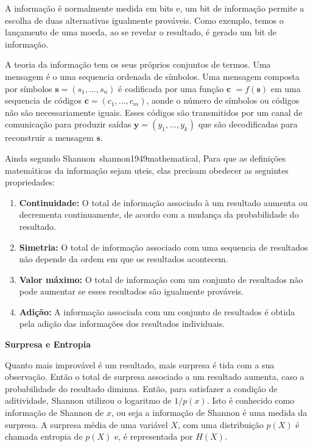 \documentclass[a4paper, 12pt]{ppgeb}
\begin{document}
A informação é normalmente medida em bits e, um bit de informação permite a escolha de duas alternativas igualmente prováveis. Como exemplo, temos o lançamento de uma moeda, ao se revelar o resultado, é gerado um bit de informação.

A teoria da informação tem os seus próprios conjuntos de termos. Uma mensagem é o uma sequencia ordenada de símbolos. Uma mensagem composta por símbolos \(\textbf{s} = (s_1, ..., s_n) \) é codificada por uma função \( \textbf{c }= f(\textbf{s})\) em uma sequencia de códigos \(\textbf{c} = (c_1, ..., c_m)\), aonde o número de símbolos ou códigos não são necessariamente iguais. Esses códigos são transmitidos por um canal de comunicação para produzir saídas \(\textbf{y} = (y_1, ..., y_k)\) que são decodificadas para reconstruir a mensagem \(\textbf{s}\).


Ainda segundo Shannon~\cite{resumoestendido}{shannon1949mathematical}, Para que as definições matemáticas da informação sejam uteis, elas precisam obedecer as seguintes propriedades:
\begin{enumerate}
\item \textbf{Continuidade:} O total de informação associado à um resultado aumenta ou decrementa  continuamente, de acordo com a mudança da probabilidade do resultado.
\item \textbf{Simetria:} O total de informação associado com uma sequencia de resultados não depende da ordem em que os resultados acontecem.
\item \textbf{Valor máximo:} O total de informação com um conjunto de resultados não pode aumentar se esses resultados são igualmente prováveis.
\item \textbf{Adição:} A informação associada com um conjunto de resultados é obtida pela adição das informações dos resultados individuais.
\end{enumerate}

\textbf{Surpresa e Entropia}

Quanto mais improvável é um resultado, mais surpresa é tida com a sua observação. Então o total de surpresa associado a um resultado aumenta, caso a probabilidade do resultado diminua. Então, para satisfazer a condição de aditividade, Shannon utilizou o logaritmo de \(1/p(x)\).  Isto é conhecido como informação de Shannon de \(x\), ou seja a informação de Shannon é uma medida da surpresa. A surpresa média de uma variável \(X\), com uma distribuição \(p(X)\) é chamada entropia de \(p(X)\) e, é representada por \(H(X)\).
\end{document}
